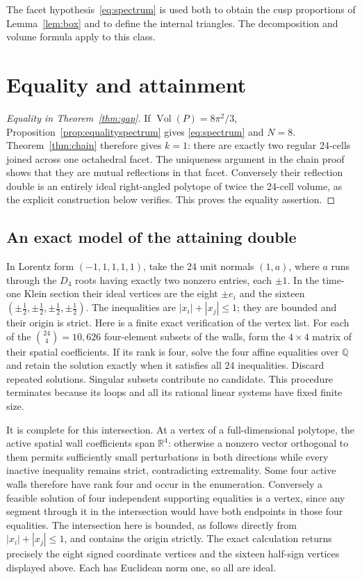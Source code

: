 \documentclass[11pt]{article}
\theoremstyle{remark}
\newcommand{\Vol}{\operatorname{Vol}}
\begin{document}
The facet hypothesis~\eqref{eq:spectrum} is used both to obtain the
cusp proportions of Lemma~\ref{lem:box} and to define the internal
triangles. The decomposition and volume formula apply to this class.

\section{Equality and attainment}\label{sec:attainment}
\begin{proof}[Equality in Theorem~\ref{thm:gap}]
If $\Vol(P)=8\pi^2/3$, Proposition~\ref{prop:equalityspectrum}
gives \eqref{eq:spectrum} and $N=8$. Theorem~\ref{thm:chain}
therefore gives $k=1$: there are exactly two regular 24-cells joined
across one octahedral facet. The uniqueness argument in
the chain proof shows that they are mutual reflections in that
facet. Conversely their reflection double is an entirely ideal
right-angled polytope of twice the 24-cell volume, as the explicit
construction below verifies. This proves the equality assertion.
\end{proof}

\subsection{An exact model of the attaining double}

In Lorentz form $(-1,1,1,1,1)$, take the 24 unit normals $(1,a)$,
where $a$ runs through the $D_4$ roots having exactly two nonzero
entries, each $\pm1$. In the time-one Klein section their ideal
vertices are the eight $\pm e_i$ and the sixteen
$(\pm\tfrac12,\pm\tfrac12,\pm\tfrac12,\pm\tfrac12)$.
The inequalities are $|x_i|+|x_j|\le1$; they are bounded and their
origin is strict. Here is a finite exact verification of the vertex list. For each of
the $\binom{24}{4}=10,626$ four-element subsets of the walls, form
the $4\times4$ matrix of their spatial coefficients. If its rank is
four, solve the four affine equalities over $\mathbb Q$ and retain
the solution exactly when it satisfies all $24$ inequalities.
Discard repeated solutions. Singular subsets contribute no candidate.
This procedure terminates because its loops and all its rational
linear systems have fixed finite size.

It is complete for this intersection. At a vertex of a full-dimensional
polytope, the active spatial wall coefficients span $\mathbb R^4$:
otherwise a nonzero vector orthogonal to them permits sufficiently
small perturbations in both directions while every inactive inequality
remains strict, contradicting extremality. Some four active walls
therefore have rank four and occur in the enumeration. Conversely a
feasible solution of four independent supporting equalities is a
vertex, since any segment through it in the intersection would have
both endpoints in those four equalities. The intersection here is
bounded, as follows directly from $|x_i|+|x_j|\le1$, and contains
the origin strictly. The exact calculation returns precisely the
eight signed coordinate vertices and the sixteen half-sign vertices
displayed above. Each has Euclidean norm one, so all are ideal.
\end{document}

